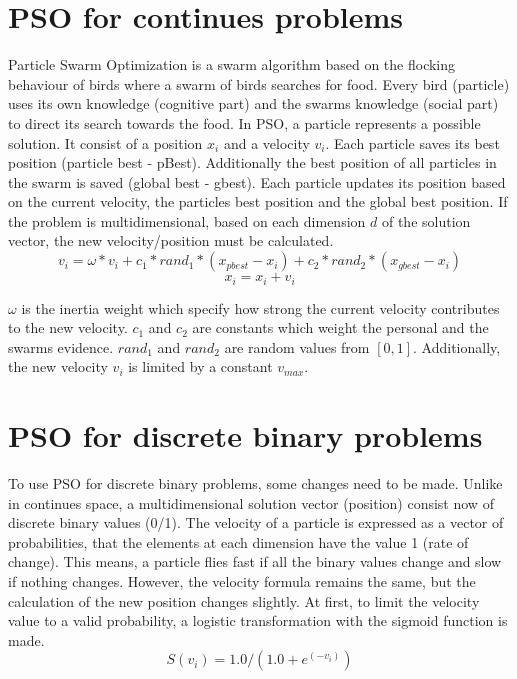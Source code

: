 \documentclass{article}
\begin{document}
\section{PSO for continues problems}
\label{lbl-pso-cont}
Particle Swarm Optimization is a swarm algorithm based on the flocking behaviour of birds where a swarm of birds searches for food. Every bird (particle) uses its own knowledge (cognitive part) and the swarms knowledge (social part) to direct its search towards the food. In PSO, a particle represents a possible solution. It consist of a position $x_i$ and a velocity $v_i$. Each particle saves its best position (particle best - pBest). Additionally the best position of all particles in the swarm is saved (global best - gbest). Each particle updates its position based on the current velocity, the particles best position and the global best position. If the problem is multidimensional, based on each dimension $d$ of the solution vector, the new velocity/position must be calculated.
\begin{equation}
\label{formula-1}
v_i = \omega * v_i + c_1 * rand_1 * (x_{pbest} - x_i) + c_2 * rand_2 * (x_{gbest} - x_i)
\end{equation}
\begin{equation}
\label{formula-2}
x_i = x_i + v_i
\end{equation}

$\omega$ is the inertia weight which specify how strong the current velocity contributes to the new velocity. $c_1$ and $c_2$ are constants which weight the personal and the swarms evidence. $rand_1$ and $rand_2$ are random values from $[0,1]$. Additionally, the new velocity $v_i$ is limited by a constant $v_{max}$.

\section{PSO for discrete binary problems}
\label{lbl-pso-disc}
To use PSO for discrete binary problems, some changes need to be made. Unlike in continues space, a multidimensional solution vector (position) consist now of discrete binary values (0/1). The velocity of a particle is expressed as a vector of probabilities, that the elements at each dimension have the value 1 (rate of change). This means, a particle flies fast if all the binary values change and slow if nothing changes. However, the velocity formula remains the same, but the calculation of the new position changes slightly. At first, to limit the velocity value to a valid probability, a logistic transformation with the sigmoid function is made.
\begin{equation}
\label{formula-3}
S(v_i) = 1.0 / (1.0 + e^{(-v_i)})
\end{equation}
\end{document}
